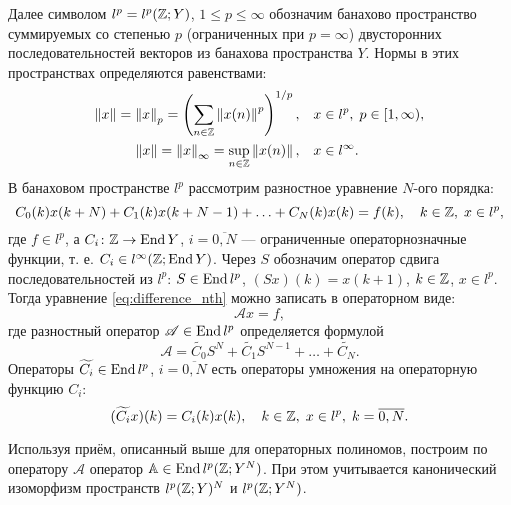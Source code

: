 Далее символом $l^p = l^p(\mathbb{Z}; Y)$, $1 \leq p \leq \infty$ обозначим банахово пространство суммируемых со степенью $p$ (ограниченных при $p = \infty$) двусторонних последовательностей векторов из банахова пространства $Y$. Нормы в этих пространствах определяются равенствами:
\begin{align*}
    \left\|x\right\| = \left\|x\right\|_p = \left(\sum_{n \in \mathbb{Z}} \left\|x(n)\right\|^p\right)^{1/p}, \quad &x \in l^p, \; p \in [1, \infty), \\
    \left\|x\right\| = \left\|x\right\|_\infty = \sup_{n\in \mathbb{Z}} \left\|x(n)\right\|, \quad &x \in l^\infty.
\end{align*}
\indent В банаховом пространстве $l^p$ рассмотрим разностное уравнение $N$-ого порядка:
\begin{equation}\label{eq:difference_nth}
C_0(k) x(k + N) + C_1(k) x(k + N - 1) + \dotsc + C_{N}(k) x(k) = f(k), \quad k \in \mathbb{Z}, \; x \in l^p,
\end{equation}
где $f \in l^p$, а $C_i \colon \mathbb{Z} \to \operatorname{End} Y$, $i = \overline{0,N}$ --- ограниченные операторнозначные функции, т. е. $C_i \in l^\infty(\mathbb{Z}; \operatorname{End} Y)$. Через $S$ обозначим оператор сдвига последовательностей из $l^p$: $S \in \operatorname{End} l^p$, $(Sx)(k) = x(k + 1)$, $k \in \mathbb{Z}$, $x \in l^p$. Тогда уравнение \eqref{eq:difference_nth} можно записать в операторном виде:
\[  \mathcal A x = f, \]
где разностный оператор $ \mathcal A \in \operatorname{End} l^p$ определяется формулой
\begin{equation}\label{eq:d_def}
\mathcal A = \widetilde{C_0} S^N + \widetilde{C_1} S^{N - 1} + \dotsc + \widetilde{C_N}.
\end{equation}
Операторы $\widetilde{C_i} \in \operatorname{End} l^p$, $i = \overline{0,N}$ есть операторы умножения на операторную функцию $C_i$:
\[ (\widetilde{C_i}x)(k) = C_i(k)x(k), \quad k \in \mathbb{Z}, \; x \in l^p, \; k = \overline{0,N}. \]

Используя приём, описанный выше для операторных полиномов, построим по оператору $\mathcal A$ оператор $\mathbb A \in \operatorname{End} l^p(\mathbb{Z}; Y^N)$. При этом учитывается канонический изоморфизм пространств $l^p(\mathbb{Z}; Y)^N$ и $l^p(\mathbb{Z}; Y^N)$.

